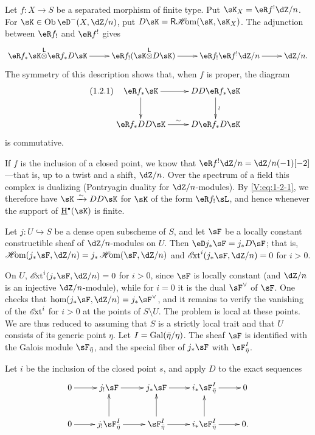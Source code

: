Let $f:X\to S$ be a separated morphism of finite type. Put
$\sK_X=\eR f^!\dZ/n$. For $\sK\in \ob\eD^-(X,\dZ/n)$, put
$D\sK = \rHom(\sK,\sK_X)$. The adjunction between $\eR f_!$ and $\eR f^!$
gives
\[\xymatrix{
  \eR f_\ast \sK\lotimes \eR f_\ast D\sK \ar[r]
    & \eR f_! (\sK\lotimes D\sK) \ar[r]
    & \eR f_! \eR f^! \dZ/n \ar[r]
    & \dZ/n \text{.}
}\]
The symmetry of this description shows that, when $f$ is proper, the diagram
\begin{equation*}\tag{1.2.1}\label{V:eq:1-2-1}
\xymatrix{
  \eR f_\ast \sK \ar[r] \ar[d]
    & D D \eR f_\ast \sK \ar[d]^-\wr \\
  \eR f_\ast D D \sK \ar[r]^\sim
    & D\eR f_\ast D\sK
}
\end{equation*}
is commutative.

If $f$ is the inclusion of a closed point, we know that
$\eR f^!\dZ/n=\dZ/n(-1)[-2]$---that is, up to a twist and a shift, $\dZ/n$.
Over the spectrum of a field this complex is dualizing (Pontryagin duality
for $\dZ/n$-modules). By \eqref{V:eq:1-2-1}, we therefore have
$\sK\iso D D\sK$ for $\sK$ of the form $\eR f_!\sL$, and hence whenever the
support of $\underline\h^\bullet(\sK)$ is finite.


\begin{theorem_}\label{V:1-3}
Let $j:U\hookrightarrow S$ be a dense open subscheme of $S$, and let $\sF$
be a locally constant constructible sheaf of $\dZ/n$-modules on $U$. Then
$\eD j_\ast \sF = j_\ast D \sF$; that is,
$\Hom(j_\ast \sF,\dZ/n) = j_\ast\Hom(\sF,\dZ/n)$ and
$\Ext^i(j_\ast\sF,\dZ/n) = 0$ for $i>0$.
\end{theorem_}

On $U$, $\Ext^i(j_\ast\sF,\dZ/n)=0$ for $i>0$, since $\sF$ is locally
constant (and $\dZ/n$ is an injective $\dZ/n$-module), while for $i=0$ it is
the dual $\sF^\vee$ of $\sF$. One checks that
$\hom(j_\ast\sF,\dZ/n)=j_\ast\sF^\vee$, and it remains to verify the
vanishing of the $\operatorname{\mathscr{E}\!xt}^i$ for $i>0$ at the points of $S\setminus U$. The
problem is local at these points. We are thus reduced to assuming that $S$
is a strictly local trait and that $U$ consists of its generic point $\eta$.
Let $I=\operatorname{Gal}(\bar\eta/\eta)$. The sheaf $\sF$ is identified with the Galois
module $\sF_{\bar\eta}$, and the special fiber of $j_\ast \sF$ with
$\sF_{\bar\eta}^I$.

Let $i$ be the inclusion of the closed point $s$, and apply $D$ to the exact
sequences
\[\xymatrix{
  0 \ar[r]
    & j_! \sF \ar[r]
    & j_\ast \sF \ar[r]
    & i_\ast \sF_{\bar\eta}^I \ar[r]
    & 0 \\
  0 \ar[r]
    & j_! \sF_{\bar\eta}^I \ar[r] \ar[u]
    & \sF_{\bar\eta}^I \ar[r] \ar[u]
    & i_\ast \sF_{\bar\eta}^I \ar[r] \ar[u]
    & 0 \text{.}
}\]

